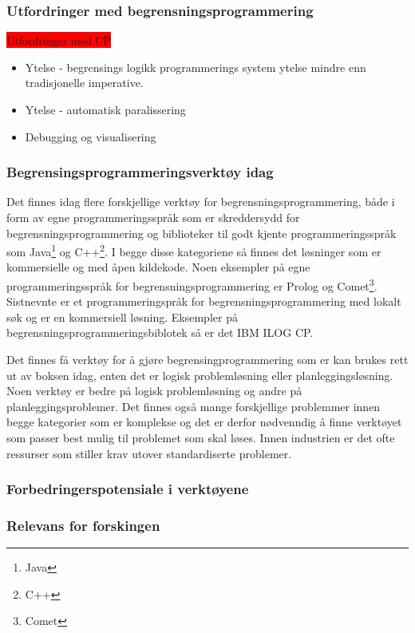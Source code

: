 \subsubsection{Utfordringer med begrensningsprogrammering}
\colorbox{red}{Utfordringer med CP}
\begin{itemize}
\item Ytelse - begrensings logikk programmerings system ytelse mindre enn tradisjonelle imperative.
\item Ytelse - automatisk paralissering
\item Debugging og visualisering
\end{itemize}

\subsubsection{Begrensingsprogrammeringsverktøy idag}
Det finnes idag flere forskjellige verktøy for begrensningsprogrammering, både i form av egne programmeringsspråk som er skreddersydd for begrensningsprogrammering og biblioteker til godt kjente programmeringsspråk som Java\footnote{Java} og C++\footnote{C++}. I begge disse kategoriene så finnes det løsninger som er kommersielle og med åpen kildekode. Noen eksempler på egne programmeringsspråk for begrensningsprogrammering er Prolog og Comet\footnote{Comet}. Sistnevnte er et programmeringspråk for begrensningsprogrammering med lokalt søk og er en kommersiell løsning. Eksempler på begrensningsprogrammeringsbiblotek så er det IBM ILOG CP.

Det finnes få verktøy for å gjøre begrensingprogrammering som er kan brukes rett ut av boksen idag, enten det er logisk problemløsning eller planleggingsløsning. Noen verktøy er bedre på logisk problemløsning og andre på planleggingsproblemer. Det finnes også mange forskjellige problemmer innen begge kategorier som er komplekse og det er derfor nødvenndig å finne verktøyet som passer best mulig til problemet som skal løses. Innen industrien er det ofte ressurser som stiller krav utover standardiserte problemer.

\subsubsection{Forbedringerspotensiale i verktøyene}

\subsubsection{Relevans for forskingen}